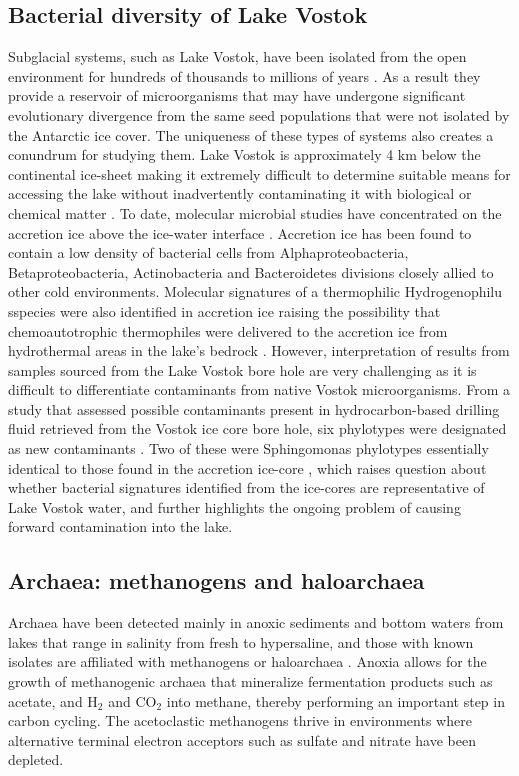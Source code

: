 \subsection{Bacterial diversity of Lake Vostok}
Subglacial systems, such as Lake Vostok, have been isolated from the open environment for hundreds of thousands to millions of years \cite{Siegert2001}.
As a result they provide a reservoir of microorganisms that may have undergone significant evolutionary divergence from the same seed populations that were not isolated by the Antarctic ice cover. 
The uniqueness of these types of systems also creates a conundrum for studying them. 
Lake Vostok is approximately 4 km below the continental ice-sheet making it extremely difficult to determine suitable means for accessing the lake without inadvertently contaminating it with biological
 or chemical matter \cite{Inman 2005, Wingham2006, Lukin2011, Gramling2012, Jones2012}. 
To date, molecular microbial studies have concentrated on the accretion ice above the ice-water interface \cite{Priscu1999, Christner2000}.
Accretion ice has been found to contain a low density of bacterial cells from Alphaproteobacteria, Betaproteobacteria, Actinobacteria and Bacteroidetes divisions closely allied to other cold environments.
Molecular signatures of a thermophilic Hydrogenophilu sspecies were also identified in accretion ice 
raising the possibility that chemoautotrophic thermophiles were delivered to the accretion ice from hydrothermal areas in the lake’s bedrock \cite{Bulat2004, Lavire2007}.
However, interpretation of results from samples sourced from the Lake Vostok bore hole are very challenging as it is difficult to differentiate contaminants from native Vostok microorganisms.
From a study that assessed possible contaminants present in hydrocarbon-based drilling fluid retrieved from the Vostok ice core bore hole, 
six phylotypes were designated as new contaminants \cite{Alekhina2007}. 
Two of these were Sphingomonas phylotypes essentially identical to those found in the accretion ice-core \cite{Christner2000},
 which raises question about whether bacterial signatures identified from the ice-cores are representative of Lake Vostok water,
 and further highlights the ongoing problem of causing forward contamination into the lake.

\subsection{Archaea: methanogens and haloarchaea}
Archaea have been detected mainly in anoxic sediments and bottom waters from lakes that range in salinity from fresh to hypersaline, 
and those with known isolates are affiliated with methanogens or haloarchaea \cite{Bowman2000a, Bowman2000b, Purdy2003, Kurasawa2010, Lauro2011}.
Anoxia allows for the growth of methanogenic archaea that mineralize fermentation products such as acetate, and H$_2$ and CO$_2$ into methane, thereby performing an important step in carbon cycling.
The acetoclastic methanogens thrive in environments where alternative terminal electron acceptors such as sulfate and nitrate have been depleted. 

